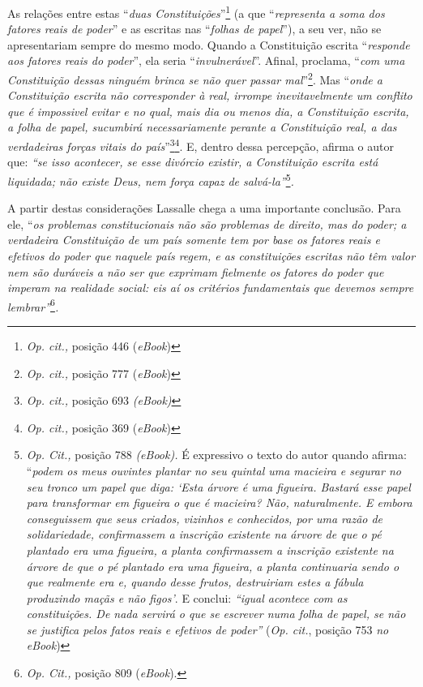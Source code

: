 As relações entre estas ``\emph{duas Constituições}''\footnote{\emph{Op.
  cit.,} posição 446 (\emph{eBook})} (a que ``\emph{representa a soma
dos fatores reais de poder}'' e as escritas nas ``\emph{folhas de
papel}''), a seu ver, não se apresentariam sempre do mesmo modo. Quando
a Constituição escrita ``\emph{responde aos fatores reais do poder}'',
ela seria ``\emph{invulnerável}''. Afinal, proclama, ``\emph{com uma
Constituição dessas ninguém brinca se não quer passar mal}''\footnote{\emph{Op.
  cit.,} posição 777 (\emph{eBook})}. Mas ``\emph{onde a Constituição
escrita não corresponder à real, irrompe inevitavelmente um conflito que
é impossivel evitar e no qual, mais dia ou menos dia, a Constituição
escrita, a folha de papel, sucumbirá necessariamente perante a
Constituição real, a das verdadeiras forças vitais do país}''\footnote{\emph{Op.
  cit.,} posição 693 \emph{(eBook)}}\footnote{\emph{Op. cit.,} posição
  369 (\emph{eBook})}. E, dentro dessa percepção, afirma o autor que:
\emph{``se isso acontecer, se esse divórcio existir, a Constituição
escrita está liquidada; não existe Deus, nem força capaz de
salvá-la''}\footnote{\emph{Op. Cit.,} posição 788 \emph{(eBook).} É
  expressivo o texto do autor quando afirma: ``\emph{podem os meus
  ouvintes plantar no seu quintal uma macieira e segurar no seu tronco
  um papel que diga: `Esta árvore é uma figueira. Bastará esse papel
  para transformar em figueira o que é macieira? Não, naturalmente. E
  embora conseguissem que seus criados, vizinhos e conhecidos, por uma
  razão de solidariedade, confirmassem a inscrição existente na árvore
  de que o pé plantado era uma figueira, a planta confirmassem a
  inscrição existente na árvore de que o pé plantado era uma figueira, a
  planta continuaria sendo o que realmente era e, quando desse frutos,
  destruiriam estes a fábula produzindo maçãs e não figos'}. E conclui:
  \emph{``igual acontece com as constituições. De nada servirá o que se
  escrever numa folha de papel, se não se justifica pelos fatos reais e
  efetivos de poder''} (\emph{Op. cit.}, posição 753 \emph{no eBook})}\emph{.}

A partir destas considerações Lassalle chega a uma importante conclusão.
Para ele, ``\emph{os problemas constitucionais não são problemas de
direito, mas do poder; a verdadeira Constituição de um país somente tem
por base os fatores reais e efetivos do poder que naquele país regem, e
as constituições escritas não têm valor nem são duráveis a não ser que
exprimam fielmente os fatores do poder que imperam na realidade social:
eis aí os critérios fundamentais que devemos sempre lembrar''}\footnote{\emph{Op.
  Cit.,} posição 809 (\emph{eBook}).}\emph{.}

